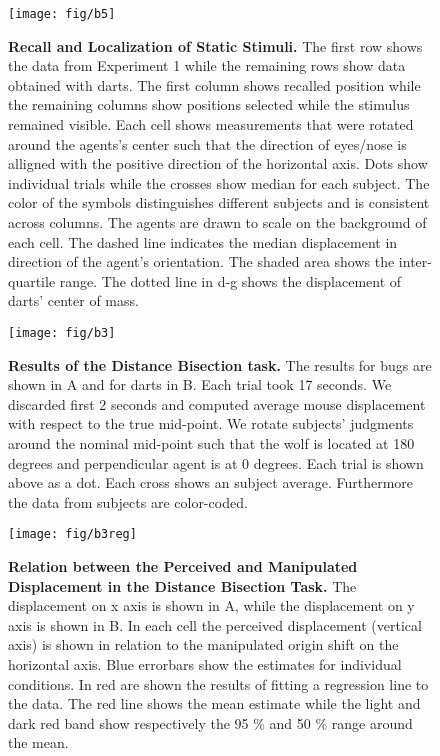 \documentclass[10pt]{article}
\begin{document}
\begin{figure}[!ht]
\begin{center}
\texttt{[image: fig/b5]}
\end{center}
\caption{
{\bf Recall and Localization of Static Stimuli.}
The first row shows the data from Experiment 1 while the remaining rows show data obtained with darts. 
The first column shows recalled position while the remaining columns show positions selected while the stimulus remained visible.
Each cell shows measurements that were rotated around the agents's center such that the direction of eyes/nose is alligned with the positive direction of the horizontal axis.  
Dots show individual trials while the crosses show median for each subject.  
The color of the symbols distinguishes different subjects and is consistent across columns.
The agents are drawn to scale on the background of each cell.  
The dashed line indicates the median displacement in direction of the agent's orientation. 
The shaded area shows the inter-quartile range. 
The dotted line in d-g shows the displacement of darts' center of mass.
}
\label{fig:b5}
\end{figure}

\begin{figure}[!ht]
\begin{center}
\texttt{[image: fig/b3]}
\end{center}
\caption{
{\bf Results of the Distance Bisection task.}
The results for bugs are shown in A and for darts in B.
Each trial took 17 seconds. We discarded first 2 seconds and computed average mouse displacement with respect to the true mid-point. We 
rotate subjects' judgments around the nominal mid-point such that the wolf is located at 180 degrees and perpendicular agent is at 0 degrees. Each trial is shown above as a dot. Each cross shows an subject average. Furthermore the data from subjects are color-coded.
}
\label{fig:b3}
\end{figure}

\begin{figure}[!ht]
\begin{center}
\texttt{[image: fig/b3reg]}
\end{center}
\caption{
{\bf Relation between the Perceived and Manipulated Displacement in the Distance Bisection Task.} The displacement on x axis is shown in A, while the displacement on y axis is shown in B. In each cell the perceived displacement (vertical axis) is shown in relation to the manipulated origin shift on the horizontal axis.  
Blue errorbars show the estimates for individual conditions. In red are shown the results of fitting a regression line to the data. The red line shows the mean estimate while the light and dark red band show respectively the 95 \% and 50 \% range around the mean. }
\label{fig:b3reg}
\end{figure}
\end{document}
